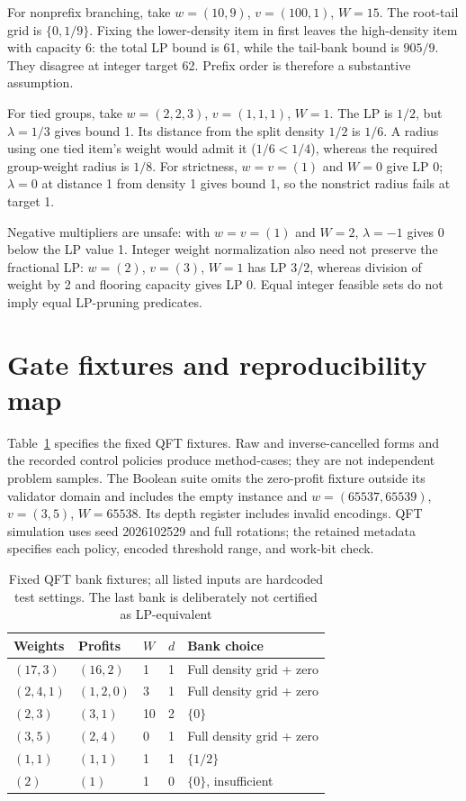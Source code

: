 \documentclass[referee,pdflatex,sn-mathphys-num]{sn-jnl}
\theoremstyle{thmstyleone}
\theoremstyle{thmstyletwo}
\begin{document}
For nonprefix branching, take $w=(10,9)$, $v=(100,1)$, $W=15$. The root-tail grid is $\{0,1/9\}$. Fixing the lower-density item in first leaves the high-density item with capacity 6: the total LP bound is 61, while the tail-bank bound is $905/9$. They disagree at integer target 62. Prefix order is therefore a substantive assumption.

For tied groups, take $w=(2,2,3)$, $v=(1,1,1)$, $W=1$. The LP is $1/2$, but $\lambda=1/3$ gives bound 1. Its distance from the split density $1/2$ is $1/6$. A radius using one tied item's weight would admit it ($1/6<1/4$), whereas the required group-weight radius is $1/8$. For strictness, $w=v=(1)$ and $W=0$ give LP 0; $\lambda=0$ at distance 1 from density 1 gives bound 1, so the nonstrict radius fails at target 1.

Negative multipliers are unsafe: with $w=v=(1)$ and $W=2$, $\lambda=-1$ gives 0 below the LP value 1. Integer weight normalization also need not preserve the fractional LP: $w=(2)$, $v=(3)$, $W=1$ has LP $3/2$, whereas division of weight by 2 and flooring capacity gives LP 0. Equal integer feasible sets do not imply equal LP-pruning predicates.

\section{Gate fixtures and reproducibility map}\label{app:reproduce}
Table~\ref{tab:fixtures} specifies the fixed QFT fixtures. Raw and inverse-cancelled forms and the recorded control policies produce method-cases; they are not independent problem samples. The Boolean suite omits the zero-profit fixture outside its validator domain and includes the empty instance and $w=(65537,65539)$, $v=(3,5)$, $W=65538$. Its depth register includes invalid encodings. QFT simulation uses seed 2026102529 and full rotations; the retained metadata specifies each policy, encoded threshold range, and work-bit check.

\begin{table}[t]
\caption{Fixed QFT bank fixtures; all listed inputs are hardcoded test settings. The last bank is deliberately not certified as LP-equivalent}\label{tab:fixtures}
\centering\small
\begin{tabular}{lllll}
\toprule
Weights & Profits & $W$ & $d$ & Bank choice\\
\midrule
$(17,3)$ & $(16,2)$ & 1 & 1 & Full density grid + zero\\
$(2,4,1)$ & $(1,2,0)$ & 3 & 1 & Full density grid + zero\\
$(2,3)$ & $(3,1)$ & 10 & 2 & $\{0\}$\\
$(3,5)$ & $(2,4)$ & 0 & 1 & Full density grid + zero\\
$(1,1)$ & $(1,1)$ & 1 & 1 & $\{1/2\}$\\
$(2)$ & $(1)$ & 1 & 0 & $\{0\}$, insufficient\\
\bottomrule
\end{tabular}
\end{table}
\end{document}
